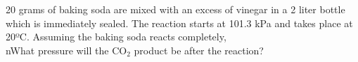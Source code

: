 \documentclass[preview]{standalone}
\begin{document}
\begin{center}
20 grams of baking soda are mixed with an excess of vinegar in a 2 liter bottle which is immediately sealed.  The reaction starts at 101.3 kPa and takes place at 20ºC.  Assuming the baking soda reacts completely, \\nWhat pressure will the CO$_{2}$ product be after the reaction?
\end{center}
\end{document}
